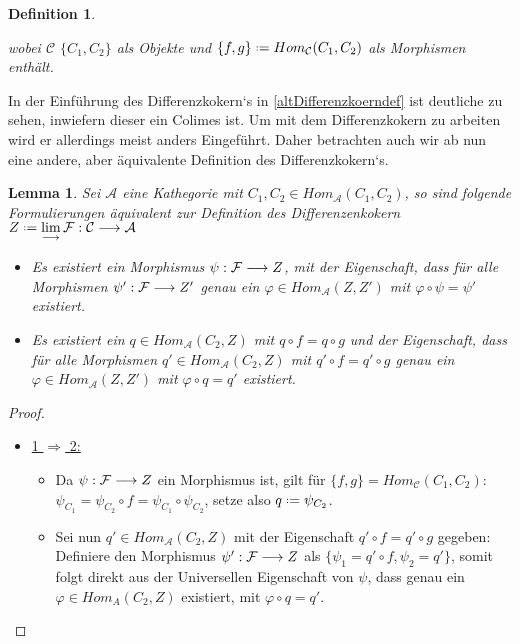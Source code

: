 \documentclass[10pt,a4paper]{report}
\newtheorem{lemma}[satz]{Lemma}
\newtheorem{definition}[satz]{Definition}
\newcommand{\functionfront}[3]{\nolinebreak{#1:#2 \longrightarrow #3}}
\newcommand{\colimes}[0]{\lim\limits_{ \longrightarrow }}
\newcommand*{\defeq}{\mathrel{\vcenter{\baselineskip0.5ex \lineskiplimit0pt
                     \hbox{\scriptsize.}\hbox{\scriptsize.}}}%
                     =}
\begin{document}
{\begin{definition}
\begin{itemize}
wobei $\mathcal{C}$ $\lbrace C_1,C_2 \rbrace$ als Objekte und $ \lbrace f,g \rbrace \defeq Hom_{\mathcal{C}}(C_1,C_2)$ als Morphismen enthält.
\end{itemize}
\end{definition}
In der Einführung des Differenzkokern`s in \cref{altDifferenzkoerndef} ist deutliche zu sehen, inwiefern dieser ein Colimes ist. Um mit dem Differenzkokern zu arbeiten wird er allerdings meist anders Eingeführt. Daher betrachten auch wir ab nun eine andere, aber äquivalente Definition des Differenzkokern`s.
\begin{lemma}\label{Differenzenkokerndef} Sei $\mathcal{A}$ eine Kathegorie mit $C_1,C_2 \in Hom_{\mathcal{A}}(C_1,C_2)$, so sind folgende Formulierungen äquivalent zur Definition des Differenzenkokern $Z \defeq \colimes \functionfront{\mathcal{F}}{\mathcal{C}}{\mathcal{A}}$
\begin{itemize}
\item[1.] Es existiert ein Morphismus $\functionfront{\psi}{\mathcal{F}}{Z}$, mit der Eigenschaft, dass für alle Morphismen $\functionfront{\psi '}{\mathcal{F}}{Z '}$ genau ein $\varphi \in Hom_{\mathcal{A}}(Z,Z')$ mit $\varphi \circ \psi = \psi '$ existiert.
\item[2.] Es existiert ein $q \in Hom_{\mathcal{A}}(C_2,Z)$ mit $q \circ f = q \circ g$ und der Eigenschaft, dass für alle Morphismen $q' \in Hom_{\mathcal{A}}(C_2,Z)$ mit $q' \circ f = q' \circ g$ genau ein $\varphi \in Hom_{\mathcal{A}}(Z,Z')$ mit $\varphi \circ q = q'$ existiert.
\begin{center}
\end{center}
\end{itemize}
\end{lemma}
\begin{proof}
\ \\
\begin{itemize}
\item \underline{1 $\Rightarrow$ 2:}
\begin{itemize}
\item[] Da $\functionfront{\psi}{\mathcal{F}}{Z}$ ein Morphismus ist, gilt für $\lbrace f,g \rbrace = Hom_{\mathcal{C}}(C_1,C_2)$:\\ $\psi_{C_1} = \psi_{C_2} \circ f = \psi_{C_1} \circ \psi_{C_2}$, setze also 
 $q  \defeq \psi_{C_2}$.
\item[] Sei nun $q' \in Hom_{\mathcal{A}}(C_2,Z)$ mit der Eigenschaft $q' \circ f = q' \circ g$ gegeben:\\
 Definiere den Morphismus $\functionfront{\psi '}{\mathcal{F}}{Z}$ als $\lbrace \psi_1 = q' \circ f , \psi_2 = q' \rbrace$,  somit folgt direkt aus der Universellen Eigenschaft von $\psi$, dass genau ein $\varphi \in Hom_{A}(C_2,Z)$ existiert, mit $ \varphi \circ q = q '$.
\end{itemize}


\end{itemize}
\end{proof}}
\end{document}
